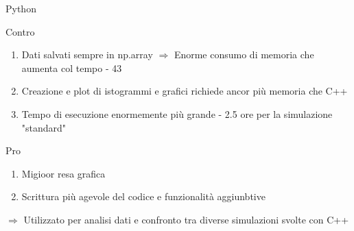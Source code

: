     \begin{frame}{Python}
        \begin{block}{Contro}
            \begin{enumerate}
                \item Dati salvati sempre in np.array $\Rightarrow$ Enorme consumo di memoria che aumenta col tempo - 43%
                \item Creazione e plot di istogrammi e grafici richiede ancor più memoria che C++
                \item Tempo di esecuzione enormemente più grande - 2.5 ore per la simulazione "standard"
            \end{enumerate}          
        \end{block}
        \begin{block}{Pro}
            \begin{enumerate}
                \item Migioor resa grafica
                \item Scrittura più agevole del codice e funzionalità aggiunbtive
            \end{enumerate}
        \end{block}
        $\Rightarrow$ Utilizzato per analisi dati e confronto tra diverse simulazioni svolte con C++
    \end{frame}
